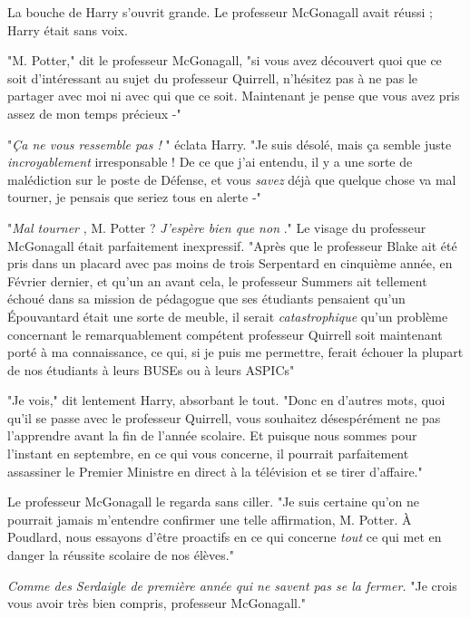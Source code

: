 La bouche de Harry s'ouvrit grande. Le professeur McGonagall avait réussi ; Harry était sans voix.

"M. Potter," dit le professeur McGonagall, "si vous avez découvert quoi que ce soit d'intéressant au sujet du professeur Quirrell, n'hésitez pas à ne pas le partager avec moi ni avec qui que ce soit. Maintenant je pense que vous avez pris assez de mon temps précieux -"

"\emph{Ça ne vous ressemble pas !} " éclata Harry. "Je suis désolé, mais ça semble juste \emph{incroyablement}  irresponsable ! De ce que j'ai entendu, il y a une sorte de malédiction sur le poste de Défense, et vous \emph{savez}  déjà que quelque chose va mal tourner, je pensais que seriez tous en alerte -"

"\emph{Mal tourner} , M. Potter ? \emph{J'espère bien que non} ." Le visage du professeur McGonagall était parfaitement inexpressif. "Après que le professeur Blake ait été pris dans un placard avec pas moins de trois Serpentard en cinquième année, en Février dernier, et qu'un an avant cela, le professeur Summers ait tellement échoué dans sa mission de pédagogue que ses étudiants pensaient qu'un Épouvantard était une sorte de meuble, il serait \emph{catastrophique}  qu'un problème concernant le remarquablement compétent professeur Quirrell soit maintenant porté à ma connaissance, ce qui, si je puis me permettre, ferait échouer la plupart de nos étudiants à leurs BUSEs ou à leurs ASPICs"

"Je vois," dit lentement Harry, absorbant le tout. "Donc en d'autres mots, quoi qu'il se passe avec le professeur Quirrell, vous souhaitez désespérément ne pas l'apprendre avant la fin de l'année scolaire. Et puisque nous sommes pour l'instant en septembre, en ce qui vous concerne, il pourrait parfaitement assassiner le Premier Ministre en direct à la télévision et se tirer d'affaire."

Le professeur McGonagall le regarda sans ciller. "Je suis certaine qu'on ne pourrait jamais m'entendre confirmer une telle affirmation, M. Potter. À Poudlard, nous essayons d'être proactifs en ce qui concerne \emph{tout}  ce qui met en danger la réussite scolaire de nos élèves."

\emph{Comme des Serdaigle de première année qui ne savent pas se la fermer.}  "Je crois vous avoir très bien compris, professeur McGonagall."


